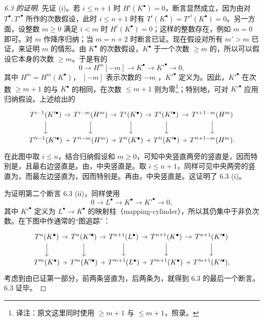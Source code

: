 \begin{proof}[6.3 的证明]
先证 (i)。若 $i\leq n+1$ 时 $H^i(K^\bullet)=0$，断言显然成立，因为由对 $T^\bullet,T'^\bullet$ 所作的次数假设，此时 $i\leq n+1$ 时有 $T^i(K^\bullet)=T'^i(K^\bullet)=0$。另一方面，设整数 $m\geq0$ 满足 $i<m$ 时 $H^i(K^\bullet)=0$；这样的整数存在，例如 $m=0$ 即可。对 $m$ 作降序归纳；当 $m=n+2$ 时断言已证。现在假设对所有 $m'>m$ 已证，来证明 $m$ 的情形。由 $K^\bullet$ 的次数假设，$K^\bullet$ 于一个次数 $\geq m$ 的，所以可以假设它本身的次数 $\geq m$。于是有的
\[
0\longrightarrow H^m[-m]\longrightarrow K^\bullet\longrightarrow K'^\bullet\longrightarrow0,
\]
其中 $H^m=H^m(K^\bullet)$， $[-m]$ 表示次数的 $-m$ ，$K'^\bullet$ 定义为。因此，$K'^\bullet$ 在次数 $\geq m+1$ 的与 $K^\bullet$ 的相同，在次数 $\leq m+1$ 则为零\footnote{译注：原文这里同时使用 $\geq m+1$ 与 $\leq m+1$，照录。}；特别地，可对 $K'^\bullet$ 应用归纳假设。上述给出的
\[
\begin{tikzcd}[column sep=tiny]
T^{i-1}(K'^\bullet)\arrow[r]\arrow[d]&T^{i-m}(H^m)\arrow[r]\arrow[d]&T^i(K^\bullet)\arrow[r]\arrow[d]&T^i(K'^\bullet)\arrow[r]\arrow[d]&T^{i+1-m}(H^m)\arrow[d]\\
T'^{i-1}(K'^\bullet)\arrow[r]&T'^{i-m}(H^m)\arrow[r]&T'^i(K^\bullet)\arrow[r]&T'^i(K'^\bullet)\arrow[r]&T'^{i+1-m}(H^m).
\end{tikzcd}
\]
在此图中取 $i\leq n$，结合归纳假设和 $m\geq0$，可知中央竖直两旁的竖直是，因而特别是，且最右边竖直是。由，中央竖直是。取 $i\leq n+1$，同样可见中央两旁的竖直为，而最左边竖直为，因而特别是。再由，中央竖直是。这证明了 6.3 (i)。

为证明第二个断言 6.3 (ii)，同样使用
\[
0\longrightarrow L^\bullet\longrightarrow K^\bullet\longrightarrow K'^\bullet\longrightarrow0,
\]
其中 $K'^\bullet$ 定义为 $L^\bullet\to K^\bullet$ 的映射柱（mapping-cylinder），所以其仍集中于非负次数。在下图中作通常的“图追踪”：
\[
\begin{tikzcd}[column sep=tiny]
T^n(K^\bullet)\arrow[r]\arrow[d]&T^n(K'^\bullet)\arrow[r]\arrow[d]&T^{n+1}(L^\bullet)\arrow[r]\arrow[d]&T^{n+1}(K^\bullet)\arrow[r]\arrow[d]&T^{n+1}(K'^\bullet)\arrow[d]\\
T'^n(K^\bullet)\arrow[r]&T'^n(K'^\bullet)\arrow[r]&T'^{n+1}(L^\bullet)\arrow[r]&T'^{n+1}(K^\bullet)\arrow[r]&T'^{n+1}(K'^\bullet),
\end{tikzcd}
\]
考虑到由已证第一部分，前两条竖直为，后两条为，就得到 6.3 的最后一个断言。6.3 证毕。
\end{proof}

